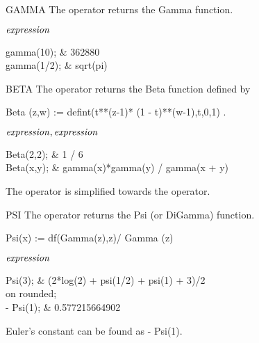\begin{Operator}{GAMMA}
The  operator returns the Gamma function.

\begin{Syntax}

\(\meta{expression}\)

\end{Syntax}

\begin{Examples}
gamma(10);             &       362880    \\
gamma(1/2);            &       sqrt(pi)
\end{Examples}
\end{Operator}

\begin{Operator}{BETA}
The  operator returns the Beta function defined by

   Beta (z,w) := defint(t**(z-1)* (1 - t)**(w-1),t,0,1)  .

\begin{Syntax}

\(\meta{expression},\meta{expression}\)

\end{Syntax}

\begin{Examples}
Beta(2,2);                  &       1 / 6 \\
Beta(x,y);                  &   gamma(x)*gamma(y) / gamma(x + y)
\end{Examples}

\begin{Comments}
The operator  is simplified towards the  operator.
\end{Comments}
\end{Operator}

\begin{Operator}{PSI}
The  operator returns the Psi (or DiGamma) function.

   Psi(x) := df(Gamma(z),z)/ Gamma (z)

\begin{Syntax}

\(\meta{expression}\)

\end{Syntax}

\begin{Examples}
Psi(3);                 & (2*log(2) + psi(1/2) + psi(1) + 3)/2 \\
on rounded; \\
- Psi(1);               &  0.577215664902
\end{Examples}

\begin{Comments}
Euler's constant can be found as  - Psi(1). 
\end{Comments}
\end{Operator}

